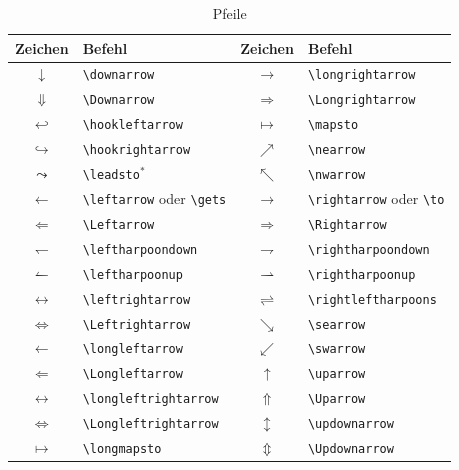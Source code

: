 \documentclass[a4paper,10pt,twoside]{scrbook}
\begin{document}
\begin{table}[h!tb]
\centering
\caption{Pfeile}
\label{Tabelle_Pfeile}       %
\begin{tabular}{clcl}
\hline
Zeichen & Befehl & Zeichen & Befehl  \\
\hline
$\downarrow$ & \texttt{\textbackslash downarrow} & 
$\longrightarrow$ & \texttt{\textbackslash longrightarrow}\\
$\Downarrow$ & \texttt{\textbackslash Downarrow} & 
$\Longrightarrow$ & \texttt{\textbackslash Longrightarrow}\\
$\hookleftarrow$ & \texttt{\textbackslash hookleftarrow} & 
$\mapsto$ & \texttt{\textbackslash mapsto} \\
$\hookrightarrow$ & \texttt{\textbackslash hookrightarrow} &  
$\nearrow$ & \texttt{\textbackslash nearrow} \\
$\leadsto$ & \texttt{\textbackslash leadsto$^\ast$} &  
$\nwarrow$ & \texttt{\textbackslash nwarrow} \\
$\leftarrow$ & \texttt{\textbackslash leftarrow} oder \texttt{\textbackslash gets}& 
$\rightarrow$ & \texttt{\textbackslash rightarrow} oder \texttt{\textbackslash to}\\
$\Leftarrow$ & \texttt{\textbackslash Leftarrow} & 
$\Rightarrow$ & \texttt{\textbackslash Rightarrow} \\
$\leftharpoondown$ & \texttt{\textbackslash leftharpoondown} & 
$\rightharpoondown$ & \texttt{\textbackslash rightharpoondown} \\
$\leftharpoonup$ & \texttt{\textbackslash leftharpoonup} & 
$\rightharpoonup$ & \texttt{\textbackslash rightharpoonup} \\
$\leftrightarrow$ & \texttt{\textbackslash leftrightarrow} & 
$\rightleftharpoons$ & \texttt{\textbackslash rightleftharpoons} \\
$\Leftrightarrow$ & \texttt{\textbackslash Leftrightarrow} & 
$\searrow$ & \texttt{\textbackslash searrow} \\
$\longleftarrow$ & \texttt{\textbackslash longleftarrow} & 
$\swarrow$ & \texttt{\textbackslash swarrow} \\
$\Longleftarrow$ & \texttt{\textbackslash Longleftarrow} & 
$\uparrow$ & \texttt{\textbackslash uparrow} \\
$\longleftrightarrow$ & \texttt{\textbackslash longleftrightarrow} & 
$\Uparrow$ & \texttt{\textbackslash Uparrow} \\
$\Longleftrightarrow$ & \texttt{\textbackslash Longleftrightarrow} & 
$\updownarrow$ & \texttt{\textbackslash updownarrow} \\
$\longmapsto$ & \texttt{\textbackslash longmapsto}& 
$\Updownarrow$ & \texttt{\textbackslash Updownarrow} \\
\hline
\end{tabular}
\end{table}
\end{document}
